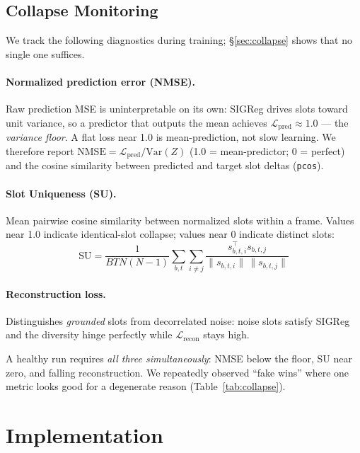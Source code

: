 \documentclass[12pt]{article}
\begin{document}
\subsection{Collapse Monitoring}
\label{sec:monitoring}

We track the following diagnostics during training; \S\ref{sec:collapse} shows that no single one suffices.

\paragraph{Normalized prediction error (NMSE).} Raw prediction MSE is uninterpretable on its own: SIGReg drives slots toward unit variance, so a predictor that outputs the mean achieves $\mathcal{L}_{\text{pred}} \approx 1.0$ --- the \emph{variance floor}. A flat loss near 1.0 is mean-prediction, not slow learning. We therefore report $\text{NMSE} = \mathcal{L}_{\text{pred}} / \text{Var}(Z)$ (1.0 = mean-predictor; 0 = perfect) and the cosine similarity between predicted and target slot deltas (\texttt{pcos}).

\paragraph{Slot Uniqueness (SU).} Mean pairwise cosine similarity between normalized slots within a frame. Values near 1.0 indicate identical-slot collapse; values near 0 indicate distinct slots:
\begin{equation}
\text{SU} = \frac{1}{BTN(N-1)}\sum_{b,t}\sum_{i \neq j} \frac{s_{b,t,i}^\top s_{b,t,j}}{\|s_{b,t,i}\| \, \|s_{b,t,j}\|}
\end{equation}

\paragraph{Reconstruction loss.} Distinguishes \emph{grounded} slots from decorrelated noise: noise slots satisfy SIGReg and the diversity hinge perfectly while $\mathcal{L}_{\text{recon}}$ stays high.

A healthy run requires \emph{all three simultaneously}: NMSE below the floor, SU near zero, and falling reconstruction. We repeatedly observed ``fake wins'' where one metric looks good for a degenerate reason (Table~\ref{tab:collapse}).

\section{Implementation}
\end{document}
